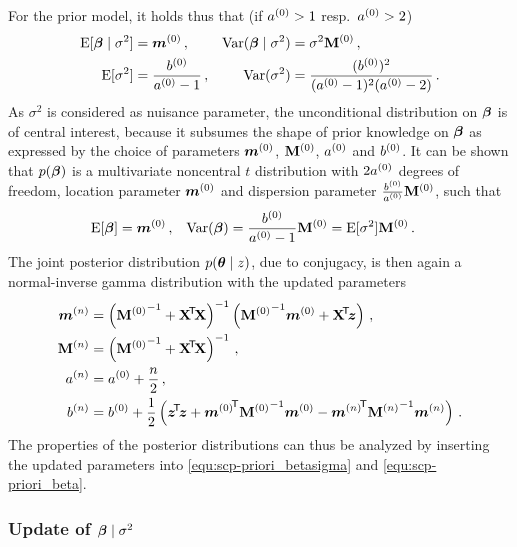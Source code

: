 For the prior model, it holds thus that (if $a^{(0)} > 1$ resp.\ $a^{(0)} > 2$)
\begin{align}
\begin{aligned}
\operatorname{E}[\boldsymbol{\beta}\mid\sigma^2] &= {\bm m}^{(0)} \,,                  & \operatorname{Var}(\boldsymbol{\beta}\mid\sigma^2) &= \sigma^2  \mathbf{M}^{(0)} \,, \\
\operatorname{E}[\sigma^2]           &= \frac{b^{(0)}}{a^{(0)} - 1} \,,  & \operatorname{Var}(\sigma^2)           &= \frac{(b^{(0)})^2}{(a^{(0)} - 1)^2 (a^{(0)} - 2)}\,.
\end{aligned}
\label{equ:scp-priori_betasigma}
\end{align}
As $\sigma^2$ is considered as nuisance parameter, the unconditional distribution
on $\boldsymbol{\beta}$ is of central interest, because it subsumes the shape of prior knowledge on $\boldsymbol{\beta}$
as expressed by the choice of parameters ${\bm m}^{(0)}$, $\mathbf{M}^{(0)}$, $a^{(0)}$ and $b^{(0)}$.
It can be shown that $p(\boldsymbol{\beta})$ is a multivariate noncentral $t$ distribution
with $2a^{(0)}$ degrees of freedom, location parameter ${\bm m}^{(0)}$ and dispersion parameter $\frac{b^{(0)}}{a^{(0)}} \mathbf{M}^{(0)}$,
such that
\begin{align}
\operatorname{E}[\boldsymbol{\beta}] &= {\bm m}^{(0)} \,, &  \operatorname{Var}(\boldsymbol{\beta}) &= \frac{b^{(0)}}{a^{(0)} - 1} \mathbf{M}^{(0)} = \operatorname{E}[\sigma^2] \mathbf{M}^{(0)}\,.
\label{equ:scp-priori_beta}
\end{align}
The joint posterior distribution $p(\boldsymbol{\theta}\mid z)$, due to conjugacy, is then
again a normal-inverse gamma distribution with the updated parameters
\begin{align*}
\mn &= \left( {\Mz}^{-1} + \XtX \right)^{-1} \left( {\Mz}^{-1} \mz + \Xtz \right) \,, \\
\Mn &= \left( {\Mz}^{-1} + \XtX \right)^{-1} \,, \\
\an &= \az + \frac{n}{2} \,, \\ %
\bn &= \bz + \frac{1}{2} \left( \ztz + {\mz}^\tra {\Mz}^{-1} \mz  - {\mn}^\tra {\Mn}^{-1} \mn \right) \,.
\end{align*}
The properties of the posterior distributions can thus be analyzed
by inserting the updated parameters into \eqref{equ:scp-priori_betasigma}
and \eqref{equ:scp-priori_beta}.


\subsubsection{Update of \texorpdfstring{$\boldsymbol{\beta}\mid\sigma^2$}{beta|sigma2}}
\label{sec:scp-update1}

